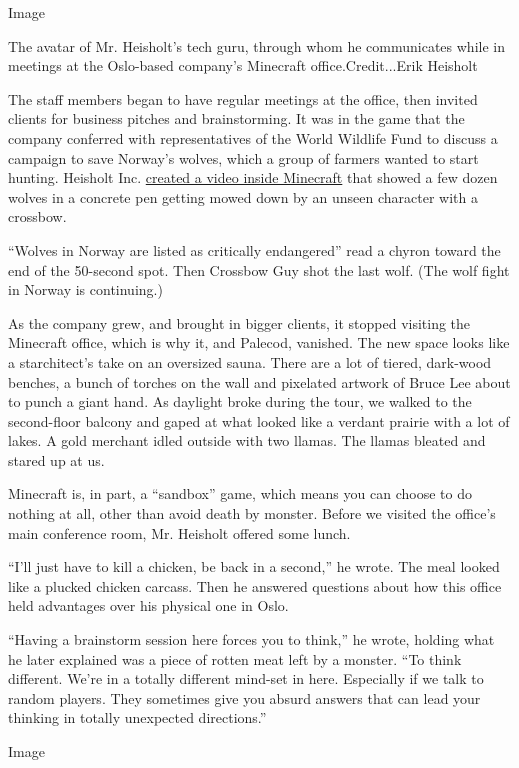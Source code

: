 Image

The avatar of Mr. Heisholt's tech guru, through whom he communicates
while in meetings at the Oslo-based company's Minecraft
office.Credit...Erik Heisholt

The staff members began to have regular meetings at the office, then
invited clients for business pitches and brainstorming. It was in the
game that the company conferred with representatives of the World
Wildlife Fund to discuss a campaign to save Norway's wolves, which a
group of farmers wanted to start hunting. Heisholt Inc.
\href{https://www.facebookcorewwwi.onion/heisholtas/videos/1740098259647029/}{created
a video inside Minecraft} that showed a few dozen wolves in a concrete
pen getting mowed down by an unseen character with a crossbow.

``Wolves in Norway are listed as critically endangered'' read a chyron
toward the end of the 50-second spot. Then Crossbow Guy shot the last
wolf. (The wolf fight in Norway is continuing.)

As the company grew, and brought in bigger clients, it stopped visiting
the Minecraft office, which is why it, and Palecod, vanished. The new
space looks like a starchitect's take on an oversized sauna. There are a
lot of tiered, dark-wood benches, a bunch of torches on the wall and
pixelated artwork of Bruce Lee about to punch a giant hand. As daylight
broke during the tour, we walked to the second-floor balcony and gaped
at what looked like a verdant prairie with a lot of lakes. A gold
merchant idled outside with two llamas. The llamas bleated and stared up
at us.

Minecraft is, in part, a ``sandbox'' game, which means you can choose to
do nothing at all, other than avoid death by monster. Before we visited
the office's main conference room, Mr. Heisholt offered some lunch.

``I'll just have to kill a chicken, be back in a second,'' he wrote. The
meal looked like a plucked chicken carcass. Then he answered questions
about how this office held advantages over his physical one in Oslo.

``Having a brainstorm session here forces you to think,'' he wrote,
holding what he later explained was a piece of rotten meat left by a
monster. ``To think different. We're in a totally different mind-set in
here. Especially if we talk to random players. They sometimes give you
absurd answers that can lead your thinking in totally unexpected
directions.''

Image

